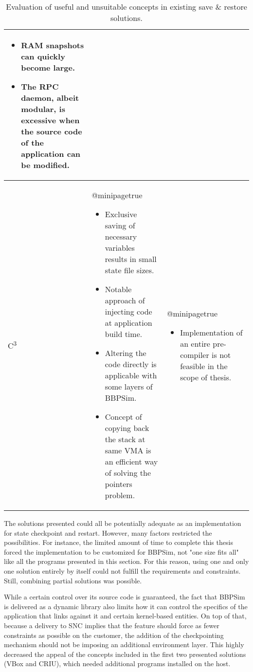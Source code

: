 {\begin{table}[htbp]
\begin{tabularx}{\linewidth}{l X X}
\begin{itemize}[leftmargin=*]
			\item RAM snapshots can quickly become large.
			\item The RPC daemon, albeit modular, is excessive when the source code of the application can be modified.
		\end{itemize}\\
		\midrule
		C\textsuperscript{3} & 
		\csname @minipagetrue\endcsname 
		\begin{itemize}[leftmargin=*]
			\item Exclusive saving of necessary variables results in small state file sizes.
			\item Notable approach of injecting code at application build time.
			\item Altering the code directly is applicable with some layers of BBPSim.
			\item Concept of copying back the stack at same \gls{VMA} is an efficient way of solving the pointers problem.
		\end{itemize} & 
		\csname @minipagetrue\endcsname 
		\begin{itemize}[leftmargin=*]
			\item Implementation of an entire pre-compiler is not feasible in the scope of thesis.
		\end{itemize}\\
		\bottomrule
	\end{tabularx}
	\caption{Evaluation of useful and unsuitable concepts in existing save \& restore solutions.}
	\label{tab:solutions-summary}
\end{table}

The solutions presented could all be potentially adequate as an implementation for state checkpoint and restart. However, many factors restricted the possibilities. For instance, the limited amount of time to complete this thesis forced the implementation to be customized for \gls{BBPSim}, not "one size fits all" like all the programs presented in this section. For this reason, using one and only one solution entirely by itself could not fulfill the requirements and constraints. Still, combining partial solutions was possible.

While a certain control over its source code is guaranteed, the fact that BBPSim is delivered as a dynamic library also limits how it can control the specifics of the application that links against it and certain kernel-based entities. On top of that, because a delivery to \gls{SNC} implies that the feature should force as fewer constraints as possible on the customer, the addition of the checkpointing mechanism should not be imposing an additional environment layer. This highly decreased the appeal of the concepts included in the first two presented solutions (VBox and CRIU), which needed additional programs installed on the host.

}
